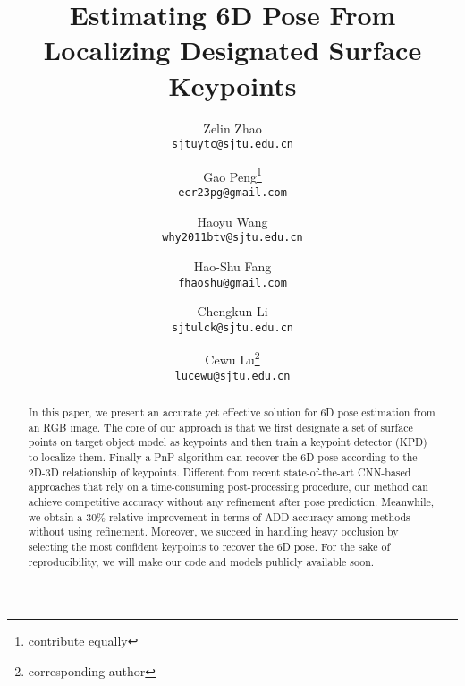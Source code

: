 \documentclass[10pt,twocolumn,letterpaper]{article}
\makeatletter
\newcommand{\printfnsymbol}[1]{\textsuperscript{\@fnsymbol{#1}}}
\makeatother
\begin{document}
\title{Estimating 6D Pose From Localizing Designated Surface Keypoints}

\author{Zelin Zhao\\
{\tt\small sjtuytc@sjtu.edu.cn}
\and
Gao Peng\thanks{contribute equally}\\
{\tt\small ecr23pg@gmail.com}
\and
Haoyu Wang\printfnsymbol{1}\\
{\tt\small why2011btv@sjtu.edu.cn}
\and
Hao-Shu Fang\\
{\tt\small fhaoshu@gmail.com}
\and
Chengkun Li\\
{\tt\small sjtulck@sjtu.edu.cn}
\and
Cewu Lu\thanks{corresponding author} \\
{\tt\small lucewu@sjtu.edu.cn}
}

\maketitle
\newcommand{\cewu}[1]{\textcolor{red}{[#1]}}
\newcommand{\haoshu}[1]{\textcolor{red}{[#1]}}
\newcommand{\haoyu}[1]{\textcolor{red}{[#1]
}}

\begin{abstract}
In this paper, we present an accurate yet effective solution for 6D pose estimation from an RGB image. The core of our approach is that we first designate a set of surface points on target object model as keypoints and then train a keypoint detector (KPD) to localize them. Finally a PnP algorithm can recover the 6D pose according to the 2D-3D relationship of keypoints. Different from recent state-of-the-art CNN-based approaches \cite{Kehl2017SSD6DMR, Rad2017BB8AS} that rely on a time-consuming post-processing procedure, our method can achieve competitive accuracy without any refinement after pose prediction. Meanwhile, we obtain a 30\% relative improvement in terms of ADD accuracy \cite{Hinterstoisser:2012:MBT:2481913.2481959} among methods without using refinement. Moreover, we succeed in handling heavy occlusion by selecting the most confident keypoints to recover the 6D pose. For the sake of reproducibility, we will make our code and models publicly available soon.
\end{abstract}
\end{document}
